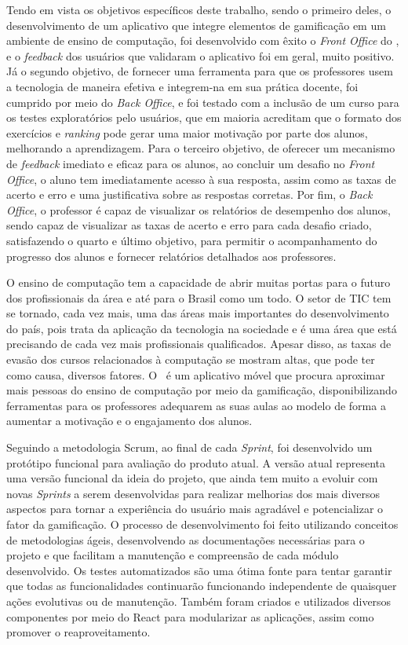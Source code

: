 Tendo em vista os objetivos específicos deste trabalho, sendo o primeiro deles, o desenvolvimento de um aplicativo que integre elementos de gamificação em um ambiente de ensino de computação, foi desenvolvido com êxito o \textit{Front Office} do \appName, e o \textit{feedback} dos usuários que validaram o aplicativo foi em geral, muito positivo. Já o segundo objetivo, de fornecer uma ferramenta para que os professores usem a tecnologia de maneira efetiva e integrem-na em sua prática docente, foi cumprido por meio do \textit{Back Office}, e foi testado com a inclusão de um curso para os testes exploratórios pelo usuários, que em maioria acreditam que o formato dos exercícios e \textit{ranking} pode gerar uma maior motivação por parte dos alunos, melhorando a aprendizagem. Para o terceiro objetivo, de oferecer um mecanismo de \textit{feedback} imediato e eficaz para os alunos, ao concluir um desafio no \textit{Front Office}, o aluno tem imediatamente acesso à sua resposta, assim como as taxas de acerto e erro e uma justificativa sobre as respostas corretas. Por fim, o \textit{Back Office}, o professor é capaz de visualizar os relatórios de desempenho dos alunos, sendo capaz de visualizar as taxas de acerto e erro para cada desafio criado, satisfazendo o quarto e último objetivo, para permitir o acompanhamento do progresso dos alunos e fornecer relatórios detalhados aos professores. 

O ensino de computação tem a capacidade de abrir muitas portas para o futuro dos profissionais da área e até para o Brasil como um todo. O setor de TIC tem se tornado, cada vez mais, uma das áreas mais importantes do desenvolvimento do país, pois trata da aplicação da tecnologia na sociedade e é uma área que está precisando de cada vez mais profissionais qualificados. Apesar disso, as taxas de evasão dos cursos relacionados à computação se mostram altas, que pode ter como causa, diversos fatores. O \appName\ é um aplicativo móvel que procura aproximar mais pessoas do ensino de computação por meio da gamificação, disponibilizando ferramentas para os professores adequarem as suas aulas ao modelo de forma a aumentar a motivação e o engajamento dos alunos.

Seguindo a metodologia Scrum, ao final de cada \textit{Sprint}, foi desenvolvido um protótipo funcional para avaliação do produto atual. A versão atual representa uma versão funcional da ideia do projeto, que ainda tem muito a evoluir com novas \textit{Sprints} a serem desenvolvidas para realizar melhorias dos mais diversos aspectos para tornar a experiência do usuário mais agradável e potencializar o fator da gamificação. O processo de desenvolvimento foi feito utilizando conceitos de metodologias ágeis, desenvolvendo as documentações necessárias para o projeto e que facilitam a manutenção e compreensão de cada módulo desenvolvido. Os testes automatizados \cite{tdd} são uma ótima fonte para tentar garantir que todas as funcionalidades continuarão funcionando independente de quaisquer ações evolutivas ou de manutenção. Também foram criados e utilizados diversos componentes por meio do React para modularizar as aplicações, assim como promover o reaproveitamento.

